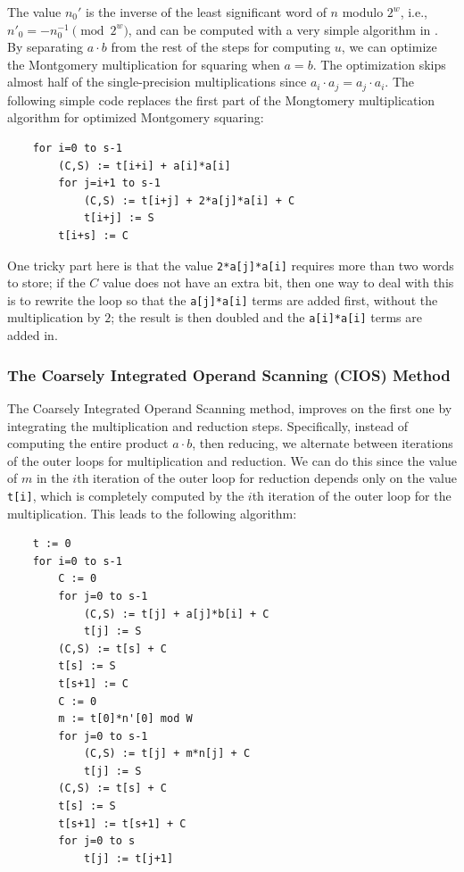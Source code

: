 \documentclass[twocolumn]{svjour3}          %
\begin{document}
The value $n_0'$ is the inverse of the least significant word of $n$
modulo $2^w$, i.e., $n'_0 = -n_0^{-1} \pmod{2^w}$, and can be computed
with a very simple algorithm in \cite{DK90:A}.  By separating $a \cdot
b$ from the rest of the steps for computing $u$, we can optimize the
Montgomery multiplication for squaring when $a=b$. The optimization 
skips almost half of the single-precision multiplications
since $a_i \cdot a_j = a_j \cdot a_i$. The following
simple code replaces the first part of the Mongtomery multiplication
algorithm for optimized Montgomery squaring:
%
\begin{verbatim}
    for i=0 to s-1
        (C,S) := t[i+i] + a[i]*a[i]
        for j=i+1 to s-1
            (C,S) := t[i+j] + 2*a[j]*a[i] + C
            t[i+j] := S
        t[i+s] := C
\end{verbatim}
%
One tricky part here is that the value \texttt{2*a[j]*a[i]} requires
more than two words to store; if the $C$ value does not have an
extra bit, then one way to deal with this is to rewrite the loop
so that the \texttt{a[j]*a[i]} terms are added first, without the multiplication
by $2$; the result is then doubled and the \texttt{a[i]*a[i]} terms are
added in.


\subsubsection{The Coarsely Integrated Operand Scanning (CIOS) Method}
\label{sect-cios}

The Coarsely Integrated Operand Scanning method,
improves on the first one by integrating the multiplication and
reduction steps. Specifically, instead of computing the entire
product $a \cdot b$, then reducing, we alternate between iterations
of the outer loops for multiplication and reduction. We can do this
since the value of $m$ in the $i$th iteration of the outer loop
for reduction depends only on the value \texttt{t[i]}, which is
completely computed by the $i$th iteration of the outer loop for the
multiplication. This leads to the following algorithm:
%
\begin{verbatim}
    t := 0
    for i=0 to s-1
        C := 0
        for j=0 to s-1
            (C,S) := t[j] + a[j]*b[i] + C
            t[j] := S
        (C,S) := t[s] + C
        t[s] := S
        t[s+1] := C
        C := 0
        m := t[0]*n'[0] mod W
        for j=0 to s-1
            (C,S) := t[j] + m*n[j] + C
            t[j] := S
        (C,S) := t[s] + C
        t[s] := S
        t[s+1] := t[s+1] + C
        for j=0 to s
            t[j] := t[j+1]
\end{verbatim}
\end{document}

